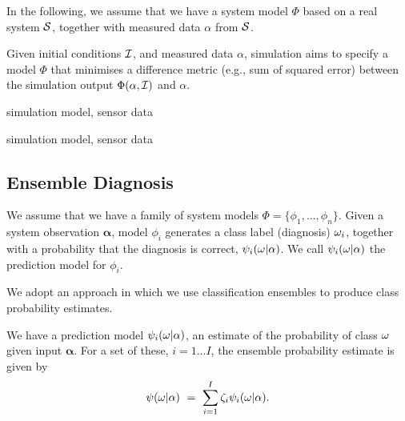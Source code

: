 In the following, we assume that we have a system model $\Phi$ based on a real system $\cal S$, together with measured data $\alpha$ from $\cal S$.

\begin{definition}
Given 
initial conditions $\cal I$, and measured data $\alpha$, simulation aims to specify a model $\Phi$ that minimises a difference metric (e.g., sum of squared error) between the simulation output $\Phi(\alpha, {\cal I})$ and $\alpha$.
\end{definition}




\begin{definition}
simulation model, sensor data
\end{definition}

\begin{definition}
simulation model, sensor data
\end{definition}

\begin{definition}[Diagnosis $\d$]

\end{definition}


\subsection{Ensemble Diagnosis}



We assume that we have a family of system models $\Phi = \{\phi_1,...,\phi_n\}$.
Given a system observation $\mathbf{\alpha}$, model $\phi_i$ generates a class label (diagnosis) $\omega_i$, together with a probability that the diagnosis is correct, $\psi_i(\omega|\mathbf{\alpha})$. We call $\psi_i(\omega|\mathbf{\alpha})$ the prediction model for  $\phi_i$.


We adopt an approach in which we use classification ensembles to produce class probability estimates. 
\begin{definition}
We have a prediction model $\psi_i(\omega|\mathbf{\alpha})$, an estimate of the probability of class $\d$ given input $\mathbf{\alpha}$. For a set of these, $i = {1...I}$, the ensemble probability estimate is given by
\begin{equation}
\relax{\psi}(\omega|\mathbf{\alpha})~=~\sum_{i=1}^I \zeta_i  \psi_i(\omega|\mathbf{\alpha}).
\end{equation}
\end{definition}

